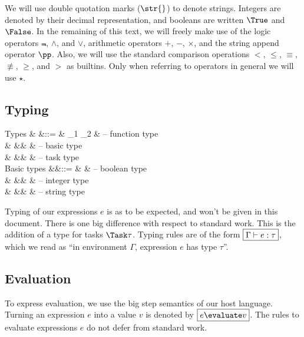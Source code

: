 We will use double quotation marks ($\str{}$) to denote strings.
Integers are denoted by their decimal representation,
and booleans are written $\True$ and $\False$.
In the remaining of this text,
we will freely make use of the logic operators $\Not$, $\land$, and $\lor$,
arithmetic operators $+$, $-$, $\times$,
and the string append operator $\pp$.
Also, we will use the standard comparison operations $<$, $\le$, $\equiv$, $\nequiv$, $\ge$, and $>$
as builtins.
Only when referring to operators in general we will use $\star$.


\subsection{Typing}

\begin{grammar}
  Types
    & \tau &::= & \tau_1 \to \tau_2 & – function type \\
    &      &\mid& \beta             & – basic type \\
    &      &\mid& \Task \tau        & – task type \\
  Basic types
    &\beta &::= & \Bool             & – boolean type \\
    &      &\mid& \Int              & – integer type \\
    &      &\mid& \String           & – string type \\
\end{grammar}
Typing of our expressions $e$ is as to be expected,
and won't be given in this document.
There is one big difference with respect to standard work.
This is the addition of a type for tasks $\Task \tau$.
Typing rules are of the form $\boxed{\Gamma \vdash e : \tau}$,
which we read as \enquote{in environment $\Gamma$, expression $e$ has type $\tau$}.


\subsection{Evaluation}
\label{sec:evaluation}

To express evaluation,
we use the big step semantics of our host language.
Turning an expression $e$ into a value $v$ is denoted by $\boxed{e \evaluate v}$.
The rules to evaluate expressions $e$ do not defer from standard work.


